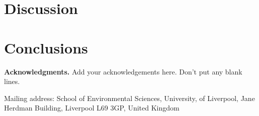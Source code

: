 \documentclass[9pt,twocolumn]{paper}
\begin{document}
\lipsum[5-8]


\section{Discussion}

\lipsum[4-8]


\section{Conclusions}

\lipsum[8]



\vspace{0.5cm}
\noindent
{\small
  \textbf{Acknowledgments.}
  Add your acknowledgements here. Don't put any blank lines.
}





\vspace{0.3cm}
\noindent
{\footnotesize
  Mailing address: School of Environmental Sciences, University, of
  Liverpool, Jane Herdman Building, Liverpool L69 3GP, United Kingdom
}
\end{document}
